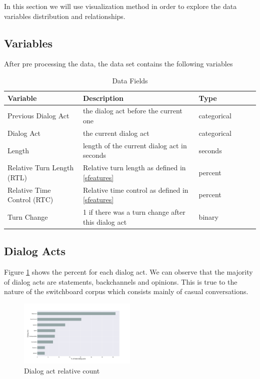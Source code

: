 In this section we will use visualization method in order to explore the data variables
distribution and relationships.

\subsection{Variables}

After pre processing the data, the data set contains the following variables

\begin{table}[ht!]
\begin{center}
\begin{tabular}{llllrr}
\toprule
Variable &  Description & Type &\\
\midrule
     Previous Dialog Act & the dialog act before the current one  & categorical\\
     Dialog Act & the current dialog act & categorical \\
     Length & length of the current dialog act in seconds & seconds \\
     Relative Turn Length (RTL)  & Relative turn length as defined in \ref{sfeatures} & percent \\
     Relative Time Control (RTC) & Relative time control as defined in \ref{sfeatures} & percent \\
     Turn Change & 1 if there was a turn change after this dialog act & binary \\
\bottomrule
\end{tabular}
\end{center}
\caption{Data Fields}
\end{table}


\subsection{Dialog Acts}

Figure \ref{dactsizefig} shows the percent for each dialog act. We can observe that the majority of dialog acts are statements, backchannels and opinions. This is true to the nature of the switchboard corpus
which consists mainly of casual conversations.

 \begin{figure}[ht!]
 \centering
 \includegraphics[width=0.5\textwidth]{../scikitlearn/figures/precent_dacts.png}
 \caption{Dialog act relative count\label{overflow}}
 \label{dactsizefig}
 \end{figure}

